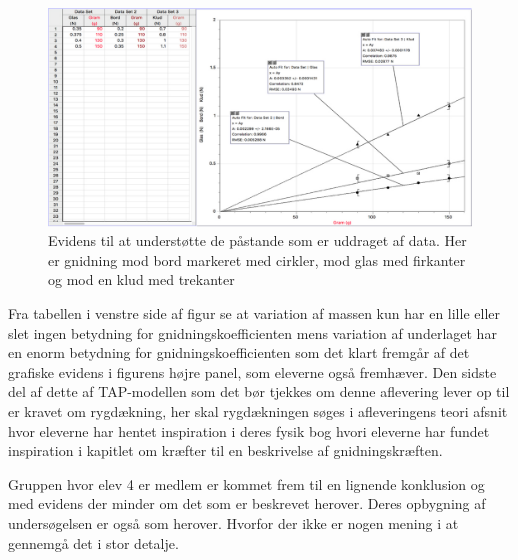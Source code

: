 \begin{figure}[h!]
	\centering
	\includegraphics[width=\textwidth]{Figs/EviAlm}
	\caption[Elev produktion 2]{Evidens til at understøtte de påstande som er uddraget af data. Her er gnidning mod bord markeret med cirkler, mod glas med firkanter og mod en klud med trekanter}
	\label{fig:evidens.alma}
\end{figure}

Fra tabellen i venstre side af figur  se at variation af massen kun har en lille eller slet ingen betydning for gnidningskoefficienten mens variation af underlaget har en enorm betydning for gnidningskoefficienten som det klart fremgår af det grafiske evidens i figurens højre panel, som eleverne også fremhæver. 
Den sidste del af dette af TAP-modellen som det bør tjekkes om denne aflevering lever op til er kravet om rygdækning, her skal rygdækningen søges i afleveringens teori afsnit hvor eleverne har hentet inspiration i deres fysik bog \citep[FysikABbogen 1]{Benoni2010} hvori eleverne har fundet inspiration i kapitlet om kræfter til en beskrivelse af gnidningskræften.

Gruppen hvor elev 4 er medlem er kommet frem til en lignende konklusion og med evidens der minder om det som er beskrevet herover. Deres opbygning af undersøgelsen er også som herover. Hvorfor der ikke er nogen mening i at gennemgå det i stor detalje. 

